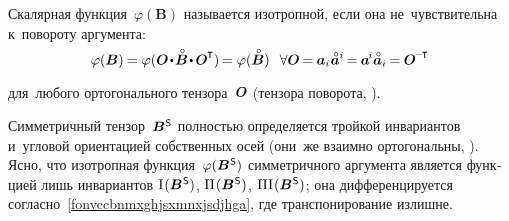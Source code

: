 \begin{otherlanguage}{russian}
Скалярная функция~${\varphi(\bm{B})}$ называется изотропной, если она не~чувствительна к~повороту аргумента:
\nopagebreak\vspace{.1em}\begin{equation*}
\varphi(\bm{B}) \hspace{-0.12ex} = \varphi ( \rotationtensor \narrowdotp \smash{\mathcircabove{\bm{B}}} \narrowdotp \hspace{.15ex} \rotationtensor^{\hspace{-0.1ex}\T} ) \hspace{-0.2ex} = \varphi(\smash{\mathcircabove{\bm{B}}}) \;\;\,
\forall \rotationtensor \hspace{-0.2ex} = \hspace{-0.1ex} \bm{a}_i \hspace{.1ex} \mathcircabove{\bm{a}}^i \hspace{-0.25ex} = \hspace{-0.1ex} \bm{a}^{\hspace{-0.2ex}i} \mathcircabove{\bm{a}}_i \hspace{-0.16ex} = \hspace{-0.1ex} \rotationtensor^{\hspace{-0.1ex}\expminusT}
\end{equation*}
\par\vspace{-0.25em}\noindent для~любого ортогонального тензора~$\bm{O}$ (тензора поворота, ).

Симметричный тензор~${\bm{B}^{\mathsf{\hspace{0.1ex}S}}}$ полностью определяется тройкой инвариантов и~угловой ориентацией собственных осей (они~же взаимно ортогональны, ). Ясно, что изотропная функция~${\varphi(\bm{B}^{\mathsf{\hspace{0.1ex}S}})}$ симметричного аргумента является функцией лишь инвариантов ${\mathrm{I}\hspace{0.16ex}({\bm{B}^{\mathsf{\hspace{0.1ex}S}}})}$, ${\mathrm{II}\hspace{0.16ex}({\bm{B}^{\mathsf{\hspace{0.1ex}S}}})}$, ${\mathrm{III}\hspace{0.16ex}({\bm{B}^{\mathsf{\hspace{0.1ex}S}}})}$; она дифференцируется согласно~\eqref{fonvccbnmxghjsxmnxjsdjhga}, где транспонирование излишне.

\end{otherlanguage}

